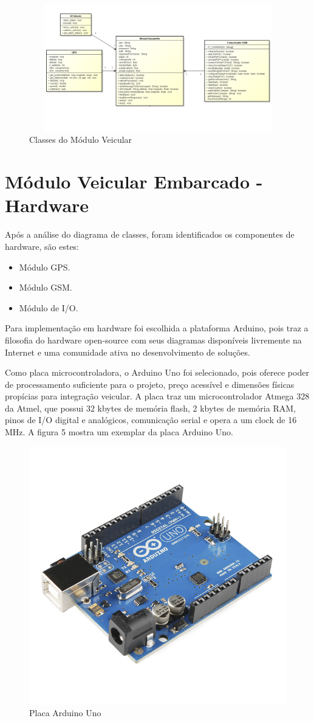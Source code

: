 \begin{figure}[!htb]
\centering
\includegraphics[width=14.00cm,height=5.5cm]{figures/5_mod_veicular.png}
\caption{Classes do Módulo Veicular}
\label{Figura 4}
\end{figure}

\section{Módulo Veicular Embarcado - Hardware}
Após a análise do diagrama de classes, foram identificados os componentes de hardware,
são estes:
\begin{itemize}
	\item Módulo GPS.
	\item Módulo GSM.
	\item Módulo de I/O.
\end{itemize}
Para implementação em hardware foi escolhida a plataforma Arduino, pois
traz a filosofia do hardware open-source com seus diagramas disponíveis 
livremente na Internet e uma comunidade ativa no desenvolvimento de soluções.

Como placa microcontroladora, o Arduino Uno foi selecionado, pois oferece
poder de processamento suficiente para o projeto, preço acessível e dimensões
físicas propícias para integração veicular. A placa traz um microcontrolador
Atmega 328 da Atmel, que possui 32 kbytes de memória flash, 2 kbytes de memória
RAM, pinos de I/O digital e analógicos, comunicação serial e opera a um clock de
16 MHz. A figura 5 mostra um exemplar da placa Arduino Uno.

\begin{figure}[!htb]
\centering
\includegraphics[width=3.00cm\textwidth]{figures/arduinoUno.jpg}
\caption{Placa Arduino Uno}
\label{Figura 5}
\end{figure}

